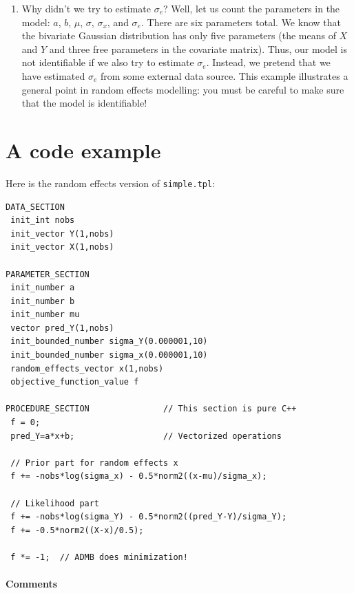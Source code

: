 \documentclass{admbmanual}
\begin{document}
\begin{enumerate}
  \item Why didn't we try to estimate $\sigma_{e}$? Well, let us count the
  parameters in the model: $a$, $b$, $\mu$, $\sigma$, $\sigma_{x}$, and
  $\sigma_{e}$. There are six parameters total. We know that the bivariate
  Gaussian distribution has only five parameters (the means of $X$ and $Y$ and
  three free parameters in the covariate matrix). Thus, our model is not
  identifiable if we also try to estimate $\sigma_{e}$. Instead, we pretend that
  we have estimated $\sigma_{e}$ from some external data source. This example
  illustrates a general point in random effects modelling: you must be careful
  to make sure that the model is identifiable!
\end{enumerate}

\section{A code example\label{sec:code example}}

Here is the random effects version of \texttt{simple.tpl}:
\begin{lstlisting}
DATA_SECTION
 init_int nobs
 init_vector Y(1,nobs)
 init_vector X(1,nobs)

PARAMETER_SECTION
 init_number a
 init_number b
 init_number mu
 vector pred_Y(1,nobs)
 init_bounded_number sigma_Y(0.000001,10)
 init_bounded_number sigma_x(0.000001,10)
 random_effects_vector x(1,nobs)
 objective_function_value f

PROCEDURE_SECTION               // This section is pure C++
 f = 0;
 pred_Y=a*x+b;                  // Vectorized operations

 // Prior part for random effects x
 f += -nobs*log(sigma_x) - 0.5*norm2((x-mu)/sigma_x);

 // Likelihood part
 f += -nobs*log(sigma_Y) - 0.5*norm2((pred_Y-Y)/sigma_Y);
 f += -0.5*norm2((X-x)/0.5);

 f *= -1;  // ADMB does minimization!
\end{lstlisting}

\paragraph{Comments}
\end{document}
